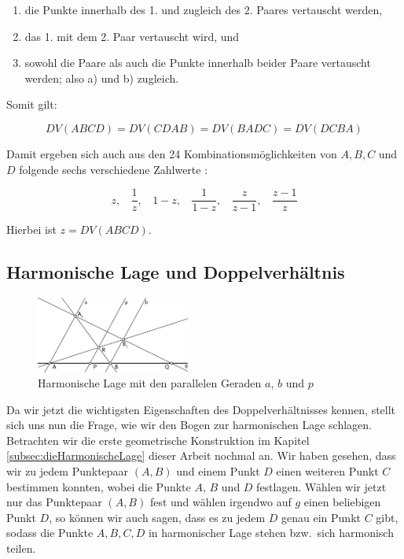 \documentclass[12pt,a4paper]{article}
\begin{document}
\begin{enumerate}[label={\alph*)}] 
\item die Punkte innerhalb des 1. und zugleich des 2. Paares vertauscht werden,
\item das 1. mit dem 2. Paar vertauscht wird, und
\item sowohl die Paare als auch die Punkte innerhalb beider Paare vertauscht werden; also a) und b) zugleich.
\end{enumerate}

Somit gilt:

\[DV(A B C D) = DV(C D A B) = DV(B A D C) = DV(D C B A)\]

Damit ergeben sich auch aus den 24 Kombinationsmöglichkeiten von $A, B, C$ und $D$ folgende sechs verschiedene Zahlwerte \citep[s.][S.~77f]{projektiveGeometrie}:

\[z, ~~~~\dfrac{1}{z}, ~~~~1-z, ~~~~\dfrac{1}{1-z}, ~~~~\dfrac{z}{z-1}, ~~~~\dfrac{z-1}{z}\]

Hierbei ist $z = DV(A B C D)$.

\subsection{Harmonische Lage und Doppelverhältnis}

\begin{figure}
\hspace{-0.025\textwidth}
\includegraphics[width=0.45\textwidth]{Bilder/doppelverhaeltnis.png}
\caption{Harmonische Lage mit den parallelen Geraden $a$, $b$ und $p$}
\label{fig:harmonDoppel}
\end{figure}

Da wir jetzt die wichtigsten Eigenschaften des Doppelverhältnisses kennen, stellt sich uns nun die Frage, wie wir den Bogen zur harmonischen Lage schlagen. Betrachten wir die erste geometrische Konstruktion im Kapitel \ref{subsec:dieHarmonischeLage} dieser Arbeit nochmal an. Wir haben gesehen, dass wir zu jedem Punktepaar $(A, B)$ und einem Punkt $D$ einen weiteren Punkt $C$ bestimmen konnten, wobei die Punkte $A$, $B$ und $D$ festlagen. Wählen wir jetzt nur das Punktepaar $(A, B)$ fest und wählen irgendwo auf $g$ einen beliebigen Punkt $D$, so können wir auch sagen, dass es zu jedem $D$ genau ein Punkt $C$ gibt, sodass die Punkte $A, B, C, D$ in harmonischer Lage stehen bzw.~sich harmonisch teilen.
\end{document}
